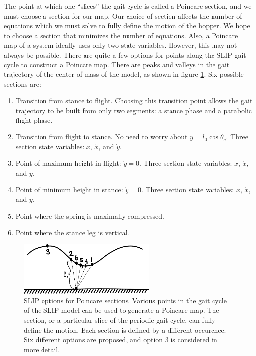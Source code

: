 The point at which one ``slices'' the gait cycle is called a Poincare section,
and we must choose a section for our map. Our choice of section affects the
number of equations which we must solve to fully define the motion of the
hopper. We hope to choose a section that minimizes the number of equations.
Also, a Poincare map of a system ideally uses only two state variables.
However, this may not always be possible.  There are quite a few options for
points along the SLIP gait cycle to construct a Poincare map. There are peaks
and valleys in the gait trajectory of the center of mass of the model, as shown
in figure \ref{fig:SLIPSections}.   Six possible sections are:

\begin{enumerate}

\item Transition from stance to flight. Choosing this transition point allows
    the gait trajectory to be built from only two segments: a stance phase and
    a parabolic flight phase. 

\item Transition from flight to stance. No need to worry about
    $y=l_{0}\cos{\theta_{c}}$.  Three section state variables: $x$, $\dot{x}$, and
    $\dot{y}$.

\item Point of maximum height in flight: $\dot{y}=0$. Three section state variables: $x$, $\dot{x}$, and $y$.
\label{item:MaxHeight}

\item Point of minimum height in stance: $\dot{y}=0$. Three section state variables: $x$, $\dot{x}$, and $y$.

\item Point where the spring is maximally compressed.

\item Point where the stance leg is vertical.

\end{enumerate}

\begin{figure}[h]		%
\begin{centering}
\includegraphics[width=0.6\textwidth]{Figures/SLIPSections}\par
\end{centering}
\caption[Diagram: SLIP Options for Poincare Sections]{SLIP options for Poincare sections. Various points in the gait cycle of the SLIP model can be used to generate a Poincare map. The section, or a particular slice of the periodic gait cycle, can fully define the motion. Each section is defined by a different occurence. Six different options are proposed, and option 3 is considered in more detail.}
\label{fig:SLIPSections}
\end{figure}
%

